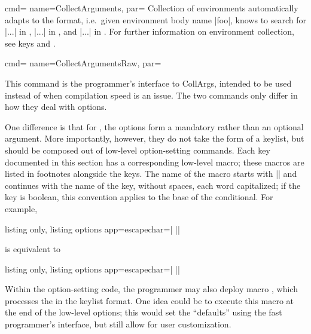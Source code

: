 \documentclass[a4paper,11pt]{article}
\begin{document}
\begin{doc}{cmd={
      name=CollectArguments,
      par=%
      \textcolor{gray}{}}}
  Collection of environments automatically adapts to the format, i.e.\ given
  environment body name |foo|,  knows to search for
   |...|  in
  ,  |...|  in , and
   |...|  in .  For further
  information on environment collection, see keys  and .
\end{doc}

\begin{doc}{cmd={
      name=CollectArgumentsRaw,
      par=%
      \textcolor{gray}{}}}
    
  This command is the programmer's interface to CollArgs, intended to be used
  instead of  when compilation speed is an issue.  The
  two commands only differ in how they deal with options.

  One difference is that for , the options form a
  mandatory rather than an optional argument.  More importantly, however, they
  do not take the form of a keylist, but should be composed out of low-level
  option-setting commands.  Each key documented in this section has a
  corresponding low-level macro; these macros are listed in footnotes alongside
  the keys.  The name of the macro starts with |\collargs| and continues with
  the name of the key, without spaces, each word capitalized; if the key is
  boolean, this convention applies to the base of the 
  conditional. For example,
  \begin{tcblisting}{listing only, listing options app={escapechar=|}}
\CollectArguments[caller=\foo, tags, verbatim]||
  \end{tcblisting}
  is equivalent to
  \begin{tcblisting}{listing only, listing options app={escapechar=|}}
\CollectArgumentsRaw{%
  \collargsCaller{\foo}%
  \collargsBeginTagtrue\collargsEndTagtrue
  \collargsVerbatim
}||
  \end{tcblisting}
  
  Within the option-setting code, the programmer may also deploy macro
  , which processes the  in the keylist
  format.  One idea could be to execute this macro at the end of the low-level
  options; this would set the ``defaults'' using the fast programmer's
  interface, but still allow for user customization.
\end{doc}
\end{document}

